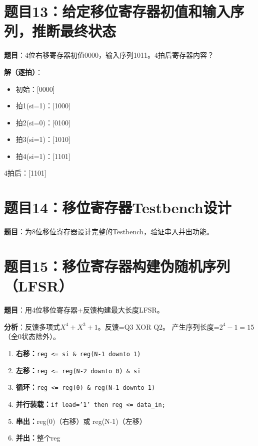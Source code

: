 \section*{题目13：给定移位寄存器初值和输入序列，推断最终状态}

\textbf{题目}：4位右移寄存器初值0000，输入序列1011。4拍后寄存器内容？

\textbf{解（逐拍）}：
\begin{itemize}
  \item 初始：[0000]
  \item 拍1(si=1)：[1000]
  \item 拍2(si=0)：[0100]
  \item 拍3(si=1)：[1010]
  \item 拍4(si=1)：[1101]
\end{itemize}

4拍后：[1101]

\section*{题目14：移位寄存器Testbench设计}

\textbf{题目}：为8位移位寄存器设计完整的Testbench，验证串入并出功能。

\section*{题目15：移位寄存器构建伪随机序列（LFSR）}

\textbf{题目}：用4位移位寄存器+反馈构建最大长度LFSR。

\textbf{分析}：反馈多项式$X^4 + X^3 + 1$。反馈=Q3 XOR Q2。
产生序列长度=$2^4-1=15$（全0状态除外）。

\begin{examtip}[移位寄存器类题目的统一解法]
\begin{enumerate}
  \item \textbf{右移：}\texttt{reg <= si \& reg(N-1 downto 1)}
  \item \textbf{左移：}\texttt{reg <= reg(N-2 downto 0) \& si}
  \item \textbf{循环：}\texttt{reg <= reg(0) \& reg(N-1 downto 1)}
  \item \textbf{并行装载：}\texttt{if load='1' then reg <= data\_in;}
  \item \textbf{串出：}reg(0)（右移）或 reg(N-1)（左移）
  \item \textbf{并出：}整个reg
\end{enumerate}
\end{examtip}

